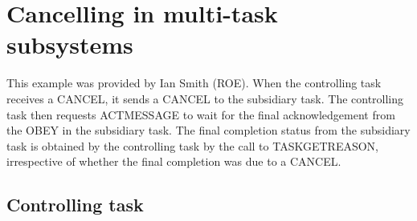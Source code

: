 \documentclass[twoside,11pt]{article}
\newcommand{\xlabel}[1]{}
\renewcommand{\_}{\texttt{\symbol{95}}}
\begin{document}
\newpage

\section{Cancelling in multi-task subsystems
\label{cmotask}\xlabel{cancelling_in_multitask_subsystems}}

This example was provided by Ian Smith (ROE). When the controlling task
receives a CANCEL, it sends a CANCEL to the subsidiary task. The
controlling task then requests ACT\_\_MESSAGE to wait for the
final acknowledgement from the OBEY in the subsidiary task. The final
completion status from the subsidiary task is obtained by the
controlling task by the call to TASK\_GET\_REASON, irrespective of
whether the final completion was due to a CANCEL.

\subsection{Controlling task}
\end{document}
